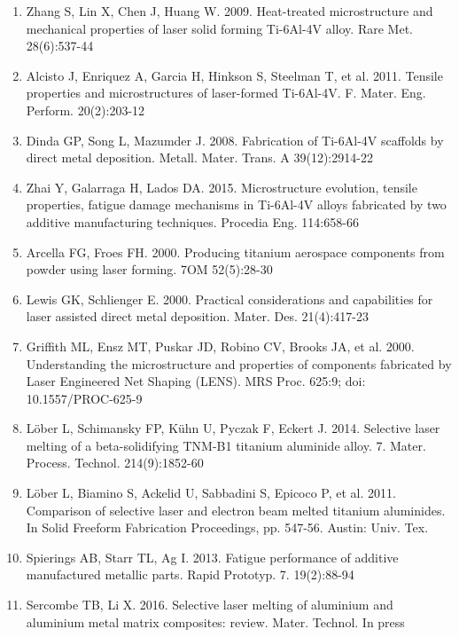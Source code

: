 \documentclass[10pt]{article}
\begin{document}
\begin{enumerate}
  \item Zhang S, Lin X, Chen J, Huang W. 2009. Heat-treated microstructure and mechanical properties of laser solid forming Ti-6Al-4V alloy. Rare Met. 28(6):537-44

  \item Alcisto J, Enriquez A, Garcia H, Hinkson S, Steelman T, et al. 2011. Tensile properties and microstructures of laser-formed Ti-6Al-4V. F. Mater. Eng. Perform. 20(2):203-12

  \item Dinda GP, Song L, Mazumder J. 2008. Fabrication of Ti-6Al-4V scaffolds by direct metal deposition. Metall. Mater. Trans. A 39(12):2914-22

  \item Zhai Y, Galarraga H, Lados DA. 2015. Microstructure evolution, tensile properties, fatigue damage mechanisms in Ti-6Al-4V alloys fabricated by two additive manufacturing techniques. Procedia Eng. 114:658-66

  \item Arcella FG, Froes FH. 2000. Producing titanium aerospace components from powder using laser forming. 7OM 52(5):28-30

  \item Lewis GK, Schlienger E. 2000. Practical considerations and capabilities for laser assisted direct metal deposition. Mater. Des. 21(4):417-23

  \item Griffith ML, Ensz MT, Puskar JD, Robino CV, Brooks JA, et al. 2000. Understanding the microstructure and properties of components fabricated by Laser Engineered Net Shaping (LENS). MRS Proc. 625:9; doi: 10.1557/PROC-625-9

  \item Löber L, Schimansky FP, Kühn U, Pyczak F, Eckert J. 2014. Selective laser melting of a beta-solidifying TNM-B1 titanium aluminide alloy. 7. Mater. Process. Technol. 214(9):1852-60

  \item Löber L, Biamino S, Ackelid U, Sabbadini S, Epicoco P, et al. 2011. Comparison of selective laser and electron beam melted titanium aluminides. In Solid Freeform Fabrication Proceedings, pp. 547-56. Austin: Univ. Tex.

  \item Spierings AB, Starr TL, Ag I. 2013. Fatigue performance of additive manufactured metallic parts. Rapid Prototyp. 7. 19(2):88-94

  \item Sercombe TB, Li X. 2016. Selective laser melting of aluminium and aluminium metal matrix composites: review. Mater. Technol. In press


\end{enumerate}
\end{document}
